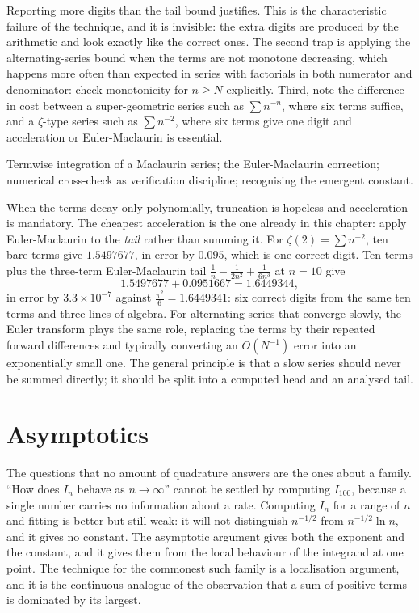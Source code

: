 \begin{trap}
Reporting more digits than the tail bound justifies. This is the characteristic failure of the technique, and it is invisible: the extra digits are produced by the arithmetic and look exactly like the correct ones. The second trap is applying the alternating-series bound when the terms are not monotone decreasing, which happens more often than expected in series with factorials in both numerator and denominator: check monotonicity for $n\geq N$ explicitly. Third, note the difference in cost between a super-geometric series such as $\sum n^{-n}$, where six terms suffice, and a $\zeta$-type series such as $\sum n^{-2}$, where six terms give one digit and acceleration or Euler-Maclaurin is essential.
\end{trap}

\begin{seealsob}Termwise integration of a Maclaurin series; the Euler-Maclaurin correction; numerical cross-check as verification discipline; recognising the emergent constant.\end{seealsob}

When the terms decay only polynomially, truncation is hopeless and acceleration is mandatory. The cheapest acceleration is the one already in this chapter: apply Euler-Maclaurin to the \emph{tail} rather than summing it. For $\zeta(2)=\sum n^{-2}$, ten bare terms give $1.5497677$, in error by $0.095$, which is one correct digit. Ten terms plus the three-term Euler-Maclaurin tail $\tfrac1n-\tfrac{1}{2n^{2}}+\tfrac{1}{6n^{3}}$ at $n=10$ give
\[1.5497677+0.0951667=1.6449344,\]
in error by $3.3\times10^{-7}$ against $\tfrac{\pi^{2}}{6}=1.6449341$: six correct digits from the same ten terms and three lines of algebra. For alternating series that converge slowly, the Euler transform plays the same role, replacing the terms by their repeated forward differences and typically converting an $O(N^{-1})$ error into an exponentially small one. The general principle is that a slow series should never be summed directly; it should be split into a computed head and an analysed tail.

\section{Asymptotics}

The questions that no amount of quadrature answers are the ones about a family. ``How does $I_{n}$ behave as $n\to\infty$'' cannot be settled by computing $I_{100}$, because a single number carries no information about a rate. Computing $I_{n}$ for a range of $n$ and fitting is better but still weak: it will not distinguish $n^{-1/2}$ from $n^{-1/2}\ln n$, and it gives no constant. The asymptotic argument gives both the exponent and the constant, and it gives them from the local behaviour of the integrand at one point. The technique for the commonest such family is a localisation argument, and it is the continuous analogue of the observation that a sum of positive terms is dominated by its largest.

